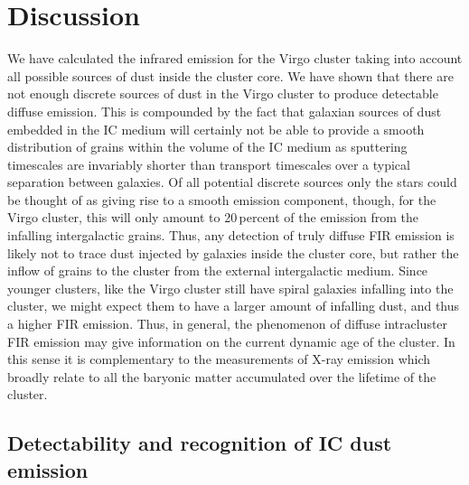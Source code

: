 \documentclass[]{aa}
\begin{document}
\section{Discussion}

We have calculated the infrared emission for the Virgo 
cluster taking into account all 
possible sources of dust inside the cluster core. We have shown that
there are not enough discrete sources of dust in the Virgo cluster to produce 
detectable diffuse emission. This is compounded by the fact that galaxian
sources of dust embedded in the IC medium will certainly not be able to
provide a smooth distribution of grains within the volume of the IC medium as
sputtering timescales are invariably shorter than transport timescales
over a typical separation between galaxies. Of all potential discrete
sources only the stars could be thought of as giving rise to a smooth
emission component, though, for the Virgo cluster, this will only amount
to 20$\,$percent of the emission from the infalling intergalactic grains.
Thus, any detection of truly diffuse FIR emission is likely not to trace 
dust injected by galaxies inside the cluster core, but rather the inflow of 
grains to the
cluster from the external intergalactic medium.
Since younger clusters, like
the Virgo cluster still have spiral galaxies infalling into the cluster, we
might expect them to have a larger amount of infalling dust, and thus a higher 
FIR emission. Thus, in general, the phenomenon of diffuse intracluster FIR 
emission may give information on the current dynamic age of the cluster.
In this sense it is
complementary to the measurements of X-ray emission which broadly relate to
all the baryonic matter accumulated over the lifetime of the cluster.


\subsection{Detectability and recognition of IC dust emission}
\end{document}
